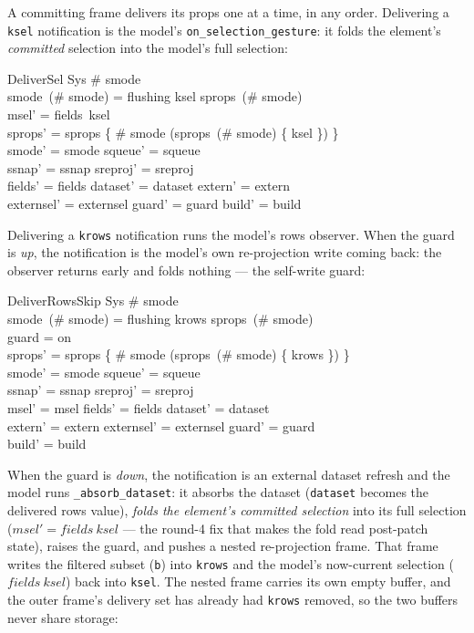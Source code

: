 \documentclass[a4paper,10pt,fleqn]{article}
\begin{document}
A committing frame delivers its props one at a time, in any order.  Delivering a
\texttt{ksel} notification is the model's \texttt{on\_selection\_gesture}: it
folds the element's \emph{committed} selection into the model's full selection:

\begin{schema}{DeliverSel}
  \Delta Sys
\where
  \# smode  \\
  smode~(\# smode) = flushing \land ksel \in sprops~(\# smode) \\
  msel' = fields~ksel \\
  sprops' = sprops \oplus \{ \# smode \mapsto (sprops~(\# smode) \setminus \{ ksel \}) \} \\
  smode' = smode \land squeue' = squeue \\
  \land ssnap' = ssnap \land sreproj' = sreproj \\
  fields' = fields \land dataset' = dataset \land extern' = extern \\
  \land externsel' = externsel \land guard' = guard \land build' = build
\end{schema}

Delivering a \texttt{krows} notification runs the model's rows observer.  When
the guard is \emph{up}, the notification is the model's own re-projection write
coming back: the observer returns early and folds nothing --- the self-write
guard:

\begin{schema}{DeliverRowsSkip}
  \Delta Sys
\where
  \# smode  \\
  smode~(\# smode) = flushing \land krows \in sprops~(\# smode) \\
  guard = on \\
  sprops' = sprops \oplus \{ \# smode \mapsto (sprops~(\# smode) \setminus \{ krows \}) \} \\
  smode' = smode \land squeue' = squeue \\
  \land ssnap' = ssnap \land sreproj' = sreproj \\
  msel' = msel \land fields' = fields \land dataset' = dataset \\
  \land extern' = extern \land externsel' = externsel \land guard' = guard \\
  \land build' = build
\end{schema}

When the guard is \emph{down}, the notification is an external dataset refresh and
the model runs \texttt{\_absorb\_dataset}: it absorbs the dataset
(\texttt{dataset} becomes the delivered rows value), \emph{folds the element's
committed selection} into its full selection ($msel' = fields~ksel$ --- the
round-4 fix that makes the fold read post-patch state), raises the guard, and
pushes a nested re-projection frame.  That frame writes the filtered subset
(\texttt{b}) into \texttt{krows} and the model's now-current selection
($fields~ksel$) back into \texttt{ksel}.  The nested frame carries its own empty
buffer, and the outer frame's delivery set has already had \texttt{krows}
removed, so the two buffers never share storage:
\end{document}
